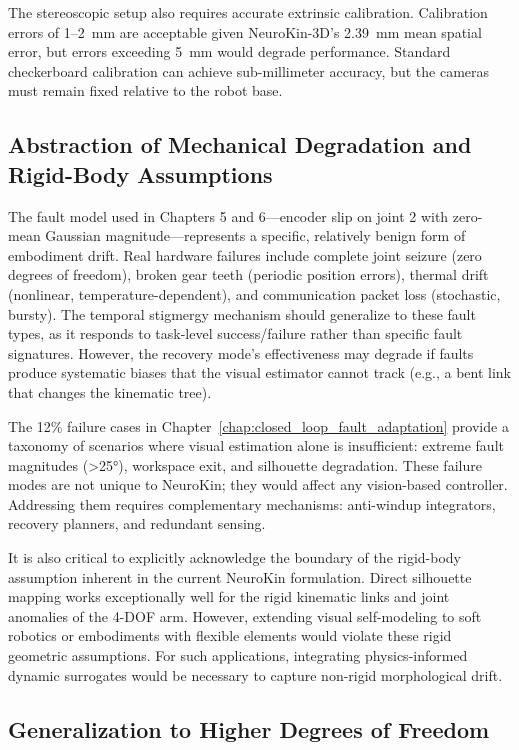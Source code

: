 \documentclass[12pt,a4paper,oneside]{report}
\begin{document}
The stereoscopic setup also requires accurate extrinsic calibration. Calibration errors of 1--2~mm are acceptable given NeuroKin-3D's 2.39~mm mean spatial error, but errors exceeding 5~mm would degrade performance. Standard checkerboard calibration can achieve sub-millimeter accuracy, but the cameras must remain fixed relative to the robot base.
\subsection{Abstraction of Mechanical Degradation and Rigid-Body Assumptions}
\label{subsec:abstraction_of_mechanical_degradation_and_rigid_body_assumptions}

The fault model used in Chapters 5 and 6---encoder slip on joint 2 with zero-mean Gaussian magnitude---represents a specific, relatively benign form of embodiment drift. Real hardware failures include complete joint seizure (zero degrees of freedom), broken gear teeth (periodic position errors), thermal drift (nonlinear, temperature-dependent), and communication packet loss (stochastic, bursty). The temporal stigmergy mechanism should generalize to these fault types, as it responds to task-level success/failure rather than specific fault signatures. However, the recovery mode's effectiveness may degrade if faults produce systematic biases that the visual estimator cannot track (e.g., a bent link that changes the kinematic tree).

The 12\% failure cases in Chapter~\ref{chap:closed_loop_fault_adaptation} provide a taxonomy of scenarios where visual estimation alone is insufficient: extreme fault magnitudes (>25°), workspace exit, and silhouette degradation. These failure modes are not unique to NeuroKin; they would affect any vision-based controller. Addressing them requires complementary mechanisms: anti-windup integrators, recovery planners, and redundant sensing.

It is also critical to explicitly acknowledge the boundary of the rigid-body assumption inherent in the current NeuroKin formulation. Direct silhouette mapping works exceptionally well for the rigid kinematic links and joint anomalies of the 4-DOF arm. However, extending visual self-modeling to soft robotics or embodiments with flexible elements would violate these rigid geometric assumptions. For such applications, integrating physics-informed dynamic surrogates would be necessary to capture non-rigid morphological drift.
\subsection{Generalization to Higher Degrees of Freedom}
\label{subsec:generalization_to_higher_degrees_of_freedom}
\end{document}
